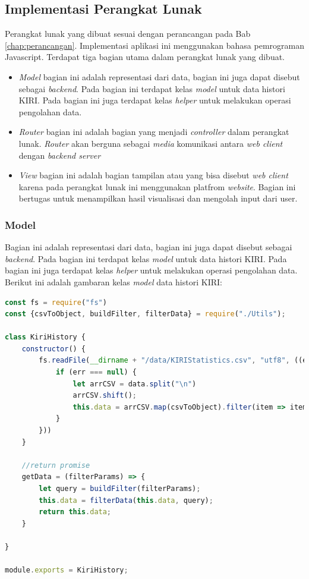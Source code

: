\subsection{Implementasi Perangkat Lunak}
Perangkat lunak yang dibuat sesuai dengan perancangan pada Bab \ref{chap:perancangan}. Implementasi aplikasi ini menggunakan bahasa pemrograman Javascript. Terdapat tiga bagian utama dalam perangkat lunak yang dibuat.

\begin{itemize}
    \item \textit{Model} bagian ini adalah representasi dari data, bagian ini juga dapat disebut sebagai \textit{backend}. Pada bagian ini terdapat kelas \textit{model} untuk data histori KIRI. Pada bagian ini juga terdapat kelas \textit{helper} untuk melakukan operasi pengolahan data.
    \item \textit{Router} bagian ini adalah bagian yang menjadi \textit{controller} dalam perangkat lunak. \textit{Router} akan berguna sebagai \textit{media} komunikasi antara \textit{web client} dengan \textit{backend server} 
    \item \textit{View} bagian ini adalah bagian tampilan atau yang bisa disebut \textit{web client} karena pada perangkat lunak ini menggunakan platfrom \textit{website}. Bagian ini bertugas untuk menampilkan hasil visualisasi dan mengolah input dari user.
\end{itemize}

\subsubsection{Model}
Bagian ini adalah representasi dari data, bagian ini juga dapat disebut sebagai \textit{backend}. Pada bagian ini terdapat kelas \textit{model} untuk data histori KIRI. Pada bagian ini juga terdapat kelas \textit{helper} untuk melakukan operasi pengolahan data. Berikut ini adalah gambaran kelas \textit{model} data histori KIRI:

\newpage \begin{lstlisting}[label=Kiri_Model, language=JavaScript, caption=Metode Load Data, breaklines]
const fs = require("fs")
const {csvToObject, buildFilter, filterData} = require("./Utils");

class KiriHistory {
    constructor() {
        fs.readFile(__dirname + "/data/KIRIStatistics.csv", "utf8", ((err, data) => {
            if (err === null) {
                let arrCSV = data.split("\n")
                arrCSV.shift();
                this.data = arrCSV.map(csvToObject).filter(item => item !== undefined);
            }
        }))
    }

    //return promise
    getData = (filterParams) => {
        let query = buildFilter(filterParams);
        this.data = filterData(this.data, query);
        return this.data;
    }

}

module.exports = KiriHistory;

\end{lstlisting}

